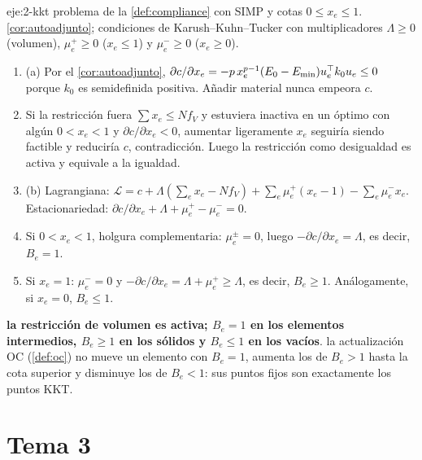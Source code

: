 \begin{solucion}{eje:2-kkt}
\datos problema de la \cref{def:compliance} con SIMP y cotas $0\le x_e\le 1$.
\planteamiento \cref{cor:autoadjunto}; condiciones de Karush--Kuhn--Tucker con multiplicadores $\Lambda\ge 0$ (volumen), $\mu_e^+\ge 0$ ($x_e\le 1$) y $\mu_e^-\ge 0$ ($x_e\ge 0$).
\pasos
\begin{enumerate}[label=\arabic*.]
  \item (a) Por el \cref{cor:autoadjunto}, $\partial c/\partial x_e=-p\,x_e^{p-1}(E_0-E_{\min})u_e^\top k_0u_e\le 0$ porque $k_0$ es semidefinida positiva. Añadir material nunca empeora $c$.
  \item Si la restricción fuera $\sum x_e\le Nf_V$ y estuviera inactiva en un óptimo con algún $0<x_e<1$ y $\partial c/\partial x_e<0$, aumentar ligeramente $x_e$ seguiría siendo factible y reduciría $c$, contradicción. Luego la restricción como desigualdad es activa y equivale a la igualdad.
  \item (b) Lagrangiana: $\mathcal{L}=c+\Lambda(\sum_ex_e-Nf_V)+\sum_e\mu_e^+(x_e-1)-\sum_e\mu_e^-x_e$. Estacionariedad: $\partial c/\partial x_e+\Lambda+\mu_e^+-\mu_e^-=0$.
  \item Si $0<x_e<1$, holgura complementaria: $\mu_e^\pm=0$, luego $-\partial c/\partial x_e=\Lambda$, es decir, $B_e=1$.
  \item Si $x_e=1$: $\mu_e^-=0$ y $-\partial c/\partial x_e=\Lambda+\mu_e^+\ge\Lambda$, es decir, $B_e\ge 1$. Análogamente, si $x_e=0$, $B_e\le 1$.
\end{enumerate}
\resultado \textbf{la restricción de volumen es activa; $B_e=1$ en los elementos intermedios, $B_e\ge 1$ en los sólidos y $B_e\le 1$ en los vacíos}.
\comprobacion la actualización OC (\cref{def:oc}) no mueve un elemento con $B_e=1$, aumenta los de $B_e>1$ hasta la cota superior y disminuye los de $B_e<1$: sus puntos fijos son exactamente los puntos KKT.
\end{solucion}

\section{Tema 3}

